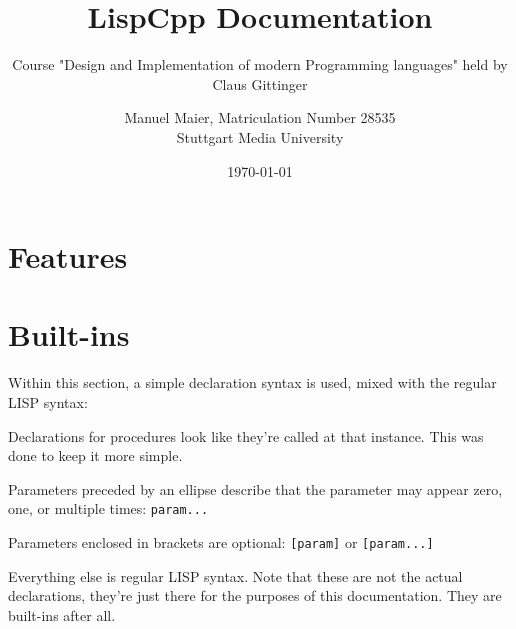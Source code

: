 \documentclass[a4paper]{scrartcl}
\title{LispCpp Documentation}
\subtitle{Course "Design and Implementation of modern Programming languages" held by Claus Gittinger}
\author{Manuel Maier, Matriculation Number 28535\\
		Stuttgart Media University}
\date{\today}
\begin{document}
\maketitle
\tableofcontents
\clearpage

\section{Features}
	
\section{Built-ins}
	Within this section, a simple declaration syntax is used, mixed with the regular LISP syntax:

	Declarations for procedures look like they're called at that instance. This was done to keep it more simple.

	Parameters preceded by an ellipse describe that the parameter may appear zero, one, or multiple times: \lstinline|param...|

	Parameters enclosed in brackets are optional: \lstinline|[param]| or \lstinline|[param...]|

	Everything else is regular LISP syntax. Note that these are not the actual declarations, they're just there for the purposes of this documentation. They are built-ins after all.

	

	
	
	
	
\end{document}
